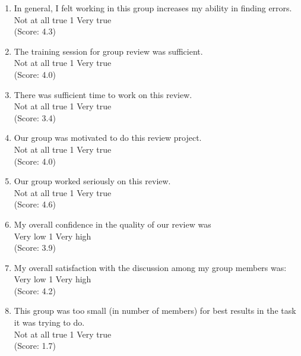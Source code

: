 \begin{enumerate}
\item In general, I felt working in this group increases my ability
in finding errors. 
\\
Not at all true \hfill 1     \hfill Very true\\
(Score: 4.3)

\item The training session for group review was sufficient.
\\
Not at all true \hfill 1     \hfill Very true\\
(Score: 4.0)

\item There was sufficient time to work on this review.
\\
Not at all true \hfill 1     \hfill Very true\\
(Score: 3.4)

\item Our group was motivated to do this review project.
\\
Not at all true \hfill 1     \hfill Very true\\
(Score: 4.0)

\item Our group worked seriously on this review.
\\
Not at all true \hfill 1     \hfill Very true\\
(Score: 4.6)

\item My overall confidence in the quality of our review was
\\
Very low \hfill 1     \hfill Very high\\
(Score: 3.9)

\item My overall satisfaction with the discussion among my group
 members was:
\\
Very low \hfill 1     \hfill Very high\\
(Score: 4.2)

\item This group was too small (in number of members) for best results
in the task it was trying to do.
\\
Not at all true \hfill 1     \hfill Very true\\
(Score: 1.7)


\end{enumerate}

